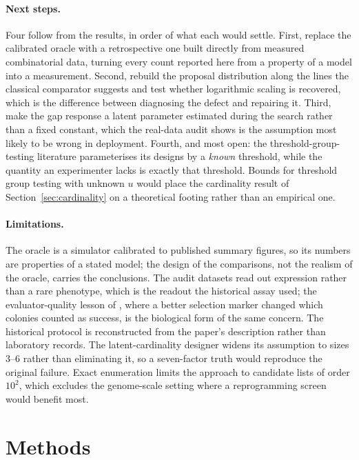 \documentclass[11pt]{article}
\begin{document}
\paragraph{Next steps.} Four follow from the results, in order of what each
would settle. First, replace the calibrated oracle with a retrospective one
built directly from measured combinatorial data, turning every count reported
here from a property of a model into a measurement. Second, rebuild the
proposal distribution along the lines the classical comparator suggests and
test whether logarithmic scaling is recovered, which is the difference between
diagnosing the defect and repairing it. Third, make the gap response a latent
parameter estimated during the search rather than a fixed constant, which the
real-data audit shows is the assumption most likely to be wrong in deployment.
Fourth, and most open: the threshold-group-testing literature parameterises its
designs by a \emph{known} threshold, while the quantity an experimenter lacks is
exactly that threshold. Bounds for threshold group testing with unknown $u$
would place the cardinality result of Section~\ref{sec:cardinality} on a
theoretical footing rather than an empirical one.

\paragraph{Limitations.} The oracle is a simulator calibrated to published
summary figures, so its numbers are properties of a stated model; the design of
the comparisons, not the realism of the oracle, carries the conclusions. The
audit datasets read out expression rather than a rare phenotype, which is the
readout the historical assay used; the evaluator-quality lesson of
\citet{okita2007}, where a better selection marker changed which colonies counted
as success, is the biological form of the same concern. The historical protocol is
reconstructed from
the paper's description rather than laboratory records. The latent-cardinality
designer widens its assumption to sizes 3--6 rather than eliminating it, so a
seven-factor truth would reproduce the original failure. Exact enumeration
limits the approach to candidate lists of order $10^2$, which excludes the
genome-scale setting where a reprogramming screen would benefit most.

\section{Methods}
\label{sec:methods}
\end{document}
